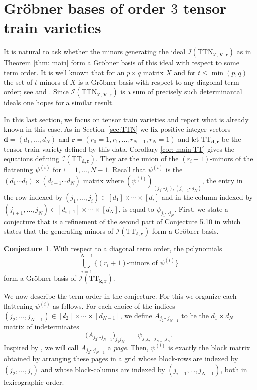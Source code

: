 \documentclass[12pt]{article}
\theoremstyle{definition}
\newtheorem{conjecture}[theorem]{Conjecture}
\numberwithin{theorem}{section}
\begin{document}
\section{Gr\"obner bases of order $3$ tensor train varieties}\label{sec: GB}
It is natural to ask whether the minors generating the ideal
$\mathcal{I}(\mathrm{TTN}_{\mathscr{T}, \mathbf{V}, \mathbf{r}})$ as in Theorem \ref{thm: main} form a Gr\"obner basis of this ideal with respect to some term order. It is well known that for an $p\times q$ matrix $X$ and for $t \leq \min(p,q)$ the set of $t$-minors of $X$ is a Gr\"obner basis with respect to any diagonal term order; see \cite{N86,CGG90,M94,St90} and \cite[Chapter 4]{BCRV22}.
Since $\mathcal{I}(\mathrm{TTN}_{\mathscr{T}, \mathbf{V}, \mathbf{r}})$ is 
a sum of precisely such determinantal ideals one hopes for a similar result. 

In this last section, we focus on tensor train varieties and report what is already known in this case. As in Section~\ref{sec:TTN} we fix  positive integer vectors $\mathbf{d} = (d_1,\dots,d_N)$ and $\mathbf{r} = (r_0=1, r_1,\dots,r_{N-1}, r_N=1)$ and let $\mathrm{TT}_{\mathbf{d},\mathbf{r}}$ be the tensor train variety defined by this data. Corollary \ref{cor: main-TT} gives the equations defining $\mathcal{I}(\mathrm{TT}_{\mathbf{d}, \mathbf{r}})$. They are the union of the $(r_i+1)$-minors of the flattening $\psi^{(i)}$ for $i=1, \ldots, N-1$. Recall that $\psi^{(i)}$ is the $(d_1\cdots d_i) \times (d_{i+1} \cdots d_N) $ matrix where $(\psi^{(i)})_{(j_1 \cdots j_i),(j_{i+1} \cdots j_N)}$, the entry in the row indexed by $(j_1, \ldots, j_i) \in [d_1] \times \cdots \times [d_i]$ and in the column indexed by 
$(j_{i+1}, \ldots, j_N) \in [d_{i+1}] \times \cdots \times [d_N]$, is equal to $\psi_{j_1 \cdots j_N}$. First, we state a conjecture that is a refinement of the second part of Conjecture 5.10 in \cite{BFHP25} which states that the generating minors of $\mathcal{I}(\mathrm{TT}_{\mathbf{d}, \mathbf{r}})$ form a Gr\"obner basis. 
\begin{conjecture} \label{conj: minors-form-GB}
With respect to a diagonal term order, the polynomials
$$ \bigcup_{i=1}^{N-1} \{ (r_i +1)\text{-minors of } \psi^{(i)}\}$$
form a Gr\"obner basis of $\mathcal{I}(\mathrm{TT}_{\mathbf{k}, \mathbf{r}})$.
\end{conjecture}
 
We now describe the term order in the conjecture. For this we organize each flattening $\psi^{(i)}$ as follows.  For each choice of the indices $(j_2,\dots,j_{N-1}) \in [d_2] \times \cdots \times [d_{N-1}]$, we define 
$A_{j_2 \cdots j_{N-1}}$ to be the $d_1 \times d_N$ matrix of indeterminates 
\[  
  \bigl(A_{j_2\cdots j_{N-1}}\bigr)_{j_1 j_N} \;=\; \psi_{j_1 j_2 \cdots j_{N-1} j_N}.
\]
Inspired by \cite{illian2025grobner}, we will call $A_{j_2\cdots j_{N-1}}$ a \emph{page}. 
Then, $\psi^{(i)}$ is exactly the block matrix obtained by arranging these pages in a grid whose block-rows are indexed by $(j_2,\dots,j_{i})$ and whose block-columns are indexed by
$(j_{i+1},\dots,j_{N-1})$, both in lexicographic order.
\end{document}
